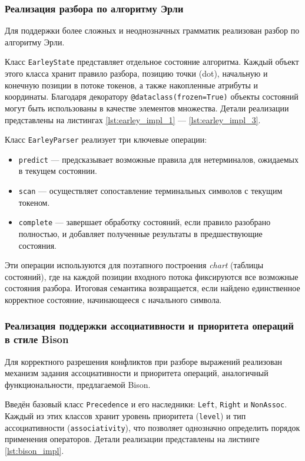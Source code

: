\documentclass[14pt, russian]{scrartcl}
\begin{document}
\subsubsection{Реализация разбора по алгоритму Эрли}

Для поддержки более сложных и неоднозначных грамматик реализован разбор по алгоритму Эрли.

Класс \texttt{EarleyState} представляет отдельное состояние алгоритма. Каждый объект этого класса хранит
правило разбора, позицию точки (dot), начальную и конечную позиции в потоке токенов, а также
накопленные атрибуты и координаты. Благодаря декоратору \texttt{@dataclass(frozen=True)} объекты состояний
могут быть использованы в качестве элементов множества. Детали реализации представлены на листингах
\ref{lst:earley_impl_1} --- \ref{lst:earley_impl_3}.

Класс \texttt{EarleyParser} реализует три ключевые операции:
\begin{itemize}
	\item \texttt{predict} --- предсказывает возможные правила для нетерминалов, ожидаемых в текущем состоянии.
	\item \texttt{scan} --- осуществляет сопоставление терминальных символов с текущим токеном.
	\item \texttt{complete} --- завершает обработку состояний, если правило разобрано
	полностью, и добавляет полученные результаты в предшествующие состояния.
\end{itemize}
Эти операции используются для поэтапного построения \emph{chart} (таблицы состояний), где на
каждой позиции входного потока фиксируются все возможные состояния разбора. Итоговая семантика
возвращается, если найдено единственное корректное состояние, начинающееся с начального символа.

\subsubsection{Реализация поддержки ассоциативности и приоритета операций в стиле Bison}

Для корректного разрешения конфликтов при разборе выражений реализован механизм задания ассоциативности и
приоритета операций, аналогичный функциональности, предлагаемой Bison.

Введён базовый класс \texttt{Precedence} и его наследники: \texttt{Left}, \texttt{Right} и \texttt{NonAssoc}.
Каждый из этих классов хранит уровень приоритета (\texttt{level}) и тип ассоциативности (\texttt{associativity}),
что позволяет однозначно определить порядок применения операторов. Детали реализации представлены на листинге
\ref{lst:bison_impl}.
\end{document}
